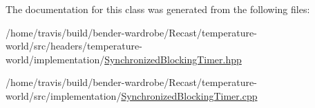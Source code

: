 The documentation for this class was generated from the following files\-:\begin{DoxyCompactItemize}
\item 
/home/travis/build/bender-\/wardrobe/\-Recast/temperature-\/world/src/headers/temperature-\/world/implementation/\hyperlink{_synchronized_blocking_timer_8hpp}{Synchronized\-Blocking\-Timer.\-hpp}\item 
/home/travis/build/bender-\/wardrobe/\-Recast/temperature-\/world/src/implementation/\hyperlink{_synchronized_blocking_timer_8cpp}{Synchronized\-Blocking\-Timer.\-cpp}\end{DoxyCompactItemize}
